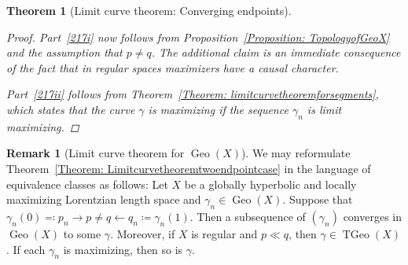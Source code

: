 \documentclass[a4paper,11pt]{article}
\numberwithin{equation}{section}
\theoremstyle{plain}
\newtheorem{Theorem}[Definition]{Theorem}
\theoremstyle{definition}
\newtheorem{Remark}[Definition]{Remark}
\DeclareMathOperator{\Geo}{Geo}
\DeclareMathOperator{\TGeo}{TGeo}
\begin{document}
\begin{Theorem}[Limit curve theorem: Converging endpoints]
\begin{proof}
    Part~\ref{217i} now follows from Proposition~\ref{Proposition: TopologyofGeoX} and the assumption that $p \neq q$. The additional claim is an immediate consequence of the fact that in regular spaces maximizers have a causal character.

    Part~\ref{217ii} follows from Theorem~\ref{Theorem: limitcurvetheoremforsegments}, which states that the curve $\gamma$ is maximizing if the sequence $\gamma_n$ is limit maximizing.
\end{proof}
\end{Theorem}

\begin{Remark}[Limit curve theorem for $\Geo(X)$]
\label{Remark: limitcurveconvendp for Geo}
We may reformulate Theorem~\ref{Theorem: Limitcurvetheoremtwoendpointcase} in the language of equivalence classes as follows: Let $X$ be a globally hyperbolic and locally maximizing Lorentzian length space and $\gamma_n \in \Geo(X)$. Suppose that $\gamma_n(0) \eqqcolon p_n \to p \neq q \leftarrow q_n \coloneqq \gamma_n(1)$. Then a subsequence of $(\gamma_n)$ converges in $\Geo(X)$ to some  $\gamma$. Moreover, if $X$ is regular and $p \ll q$, then $\gamma \in \TGeo(X)$. If each $\gamma_n$ is maximizing, then so is $\gamma$.
\end{Remark}
\end{document}
